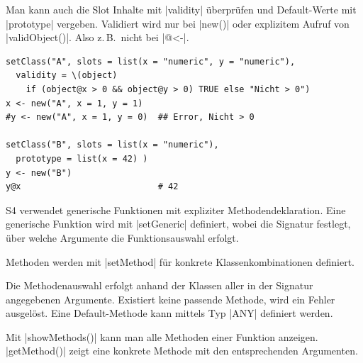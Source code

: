 \documentclass[10pt,twocolumn]{scrartcl}
\renewcommand{\lstinline}{\mycoloredinline}
\begin{document}
Man kann auch die Slot Inhalte mit \lstinline|validity| überprüfen und Default-Werte mit \lstinline|prototype| vergeben. Validiert wird nur bei \lstinline|new()| oder explizitem Aufruf von \lstinline|validObject()|. Also z.\,B.\ nicht bei \lstinline|@<-|.

\begin{lstlisting}
setClass("A", slots = list(x = "numeric", y = "numeric"),
  validity = \(object)
    if (object@x > 0 && object@y > 0) TRUE else "Nicht > 0")
x <- new("A", x = 1, y = 1)
#y <- new("A", x = 1, y = 0)  ## Error, Nicht > 0

setClass("B", slots = list(x = "numeric"),
  prototype = list(x = 42) )
y <- new("B")
y@x                           # 42
\end{lstlisting}

S4 verwendet generische Funktionen mit expliziter Methodendeklaration. Eine generische Funktion wird mit \lstinline|setGeneric| definiert, wobei die Signatur festlegt, über welche Argumente die Funktionsauswahl erfolgt.

Methoden werden mit \lstinline|setMethod| für konkrete Klassenkombinationen definiert.

Die Methodenauswahl erfolgt anhand der Klassen aller in der Signatur angegebenen Argumente. Existiert keine passende Methode, wird ein Fehler ausgelöst. Eine Default-Methode kann mittels Typ \lstinline|ANY| definiert werden.

Mit \lstinline|showMethods()| kann man alle Methoden einer Funktion anzeigen. \lstinline|getMethod()| zeigt eine konkrete Methode mit den entsprechenden Argumenten.
\end{document}
